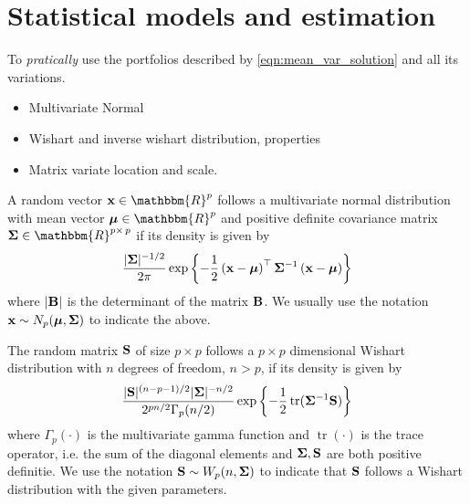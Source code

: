 \documentclass[]{book}
\begin{document}

\chapter{Statistical models and estimation}
To \textit{pratically} use the portfolios described by \eqref{eqn:mean_var_solution} and all its variations.

\begin{itemize}
	\item Multivariate Normal
	\item Wishart and inverse wishart distribution, properties
	\item Matrix variate location and scale. 
\end{itemize}

\begin{definition}
	A random vector $\bx \in \mathbbm{R}^p$ follows a multivariate normal distribution with mean vector $\bmu \in \mathbbm{R}^p$ and positive definite covariance matrix  $\bSigma \in \mathbbm{R}^{p \times\, p}$ if its density is given by 
	\begin{equation}\label{eqn:multi_density}
	\frac{|\mathbf{\Sigma}|^{-1/2}}{2\pi} \exp \left\{-\frac{1}{2} \left(\mathbf{x} - \mbox{\boldmath$\mu$} \right)^\top\mathbf{\Sigma}^{-1}\left(\mathbf{x} - \mbox{\boldmath$\mu$} \right) \right\}
	\end{equation}
	where $|\mathbf{B}|$ is the determinant of the matrix $\mathbf{B}$. We usually use the notation $\mathbf{x} \sim N_p(\mbox{\boldmath$\mu$}, \mathbf{\Sigma})$ to indicate the above.
\end{definition} 

\begin{definition}
	The random matrix $\mathbf{S}$ of size $p \times p$ follows a $p\times p$ dimensional Wishart distribution with $n$ degrees of freedom, $n > p$, if its density is given by
	\begin{equation}\label{eqn:wishart_density}
	\frac{|\mathbf{S}|^{(n-p-1)/2} |\mathbf{\Sigma}|^{- n/2} }{2^{pn/2} \Gamma_p (n/2) } \exp\left\{-\frac{1}{2} \operatorname{tr}(\mathbf{\Sigma}^{-1}\mathbf{S})  \right\}
	\end{equation}
	where $ \Gamma_p (\cdot) $ is the multivariate gamma function and $\operatorname{tr}(\cdot)$ is the trace operator, i.e. the sum of the diagonal elements and $\mathbf{\Sigma}, \mathbf{S}$ are both positive definitie. We use the notation $\mathbf{S} \sim W_p(n, \mathbf{\Sigma})$ to indicate that $\mathbf{S}$ follows a Wishart distribution with the given parameters.
\end{definition}
\end{document}
